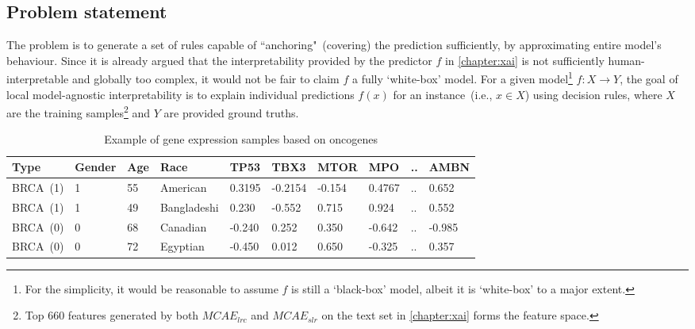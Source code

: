 \subsection{Problem statement}
The problem is to generate a set of rules capable of ``anchoring"~(covering) the prediction sufficiently, by approximating entire model's behaviour. Since it is already argued that the interpretability provided by the predictor ${f}$ in \cref{chapter:xai} is not sufficiently human-interpretable and globally too complex, it would not be fair to claim ${f}$ a fully `white-box' model. For a given model\footnote{For the simplicity, it would be reasonable to assume ${f}$ is  still a `black-box' model, albeit it is `white-box' to a major extent.} ${f}: X \rightarrow Y$, the goal of local model-agnostic interpretability is to explain individual predictions ${f}(x)$ for an instance~(i.e., $x \in X$) using decision rules, where $X$ are the training samples\footnote{Top 660 features generated by both $MCAE_{lrc}$ and $MCAE_{slr}$ on the text set in \cref{chapter:xai} forms the feature space.} and $Y$ are provided ground truths. %

\begin{table}[h!]
    \caption{Example of gene expression samples based on oncogenes}
    \label{ge:ancor_example}
    \vspace{-6mm}
    \begin{center}
        \scriptsize
        \begin{tabular}{l|l|l|l|l|l|l|l|l|l}
            \hline
            \rowcolor{Gray}
            \textbf{Type} & \textbf{Gender} & \textbf{Age} & \textbf{Race} & \textbf{TP53} & \textbf{TBX3} & \textbf{MTOR} & \textbf{MPO}  & .. & \textbf{AMBN} \\\hline    
            BRCA~(1) & 1 & 55 & American & 0.3195 & -0.2154 & -0.154 & 0.4767  & .. & 0.652 \\\hline
            BRCA~(1) & 1 & 49 & Bangladeshi & 0.230 &  -0.552  & 0.715  & 0.924   & .. & 0.552 \\\hline
            BRCA~(0) & 0 & 68 & Canadian & -0.240 &  0.252  & 0.350  & -0.642  & .. & -0.985 \\\hline
            BRCA~(0) & 0 & 72 & Egyptian & -0.450 &  0.012  & 0.650  & -0.325  & .. & 0.357 \\\hline
        \end{tabular}
        \vspace{-4mm}
    \end{center}
\end{table}

